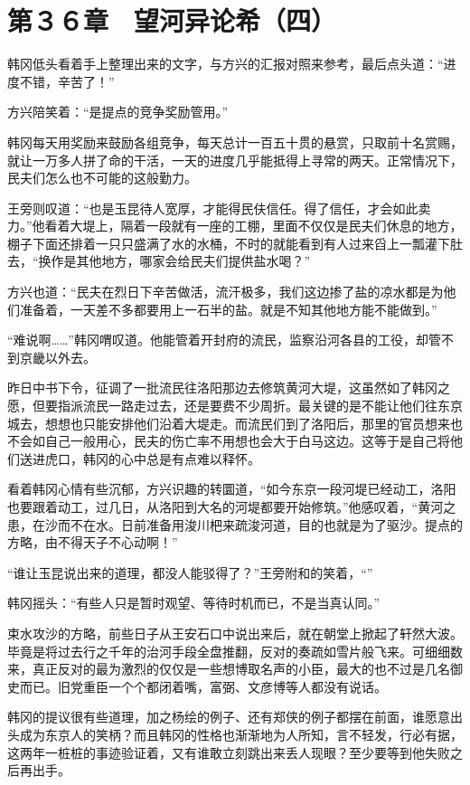\section{第３６章　望河异论希（四）}

韩冈低头看着手上整理出来的文字，与方兴的汇报对照来参考，最后点头道：“进度不错，辛苦了！”

方兴陪笑着：“是提点的竞争奖励管用。”

韩冈每天用奖励来鼓励各组竞争，每天总计一百五十贯的悬赏，只取前十名赏赐，就让一万多人拼了命的干活，一天的进度几乎能抵得上寻常的两天。正常情况下，民夫们怎么也不可能的这般勤力。

王旁则叹道：“也是玉昆待人宽厚，才能得民伕信任。得了信任，才会如此卖力。”他看着大堤上，隔着一段就有一座的工棚，里面不仅仅是民夫们休息的地方，棚子下面还排着一只只盛满了水的水桶，不时的就能看到有人过来舀上一瓢灌下肚去，“换作是其他地方，哪家会给民夫们提供盐水喝？”

方兴也道：“民夫在烈日下辛苦做活，流汗极多，我们这边掺了盐的凉水都是为他们准备着，一天差不多都要用上一石半的盐。就是不知其他地方能不能做到。”

“难说啊……”韩冈喟叹道。他能管着开封府的流民，监察沿河各县的工役，却管不到京畿以外去。

昨日中书下令，征调了一批流民往洛阳那边去修筑黄河大堤，这虽然如了韩冈之愿，但要指派流民一路走过去，还是要费不少周折。最关键的是不能让他们往东京城去，想想也只能安排他们沿着大堤走。而流民们到了洛阳后，那里的官员想来也不会如自己一般用心，民夫的伤亡率不用想也会大于白马这边。这等于是自己将他们送进虎口，韩冈的心中总是有点难以释怀。

看着韩冈心情有些沉郁，方兴识趣的转圜道，“如今东京一段河堤已经动工，洛阳也要跟着动工，过几日，从洛阳到大名的河堤都要开始修筑。”他感叹着，“黄河之患，在沙而不在水。日前准备用浚川杷来疏浚河道，目的也就是为了驱沙。提点的方略，由不得天子不心动啊！”

“谁让玉昆说出来的道理，都没人能驳得了？”王旁附和的笑着，“”

韩冈摇头：“有些人只是暂时观望、等待时机而已，不是当真认同。”

束水攻沙的方略，前些日子从王安石口中说出来后，就在朝堂上掀起了轩然大波。毕竟是将过去行之千年的治河手段全盘推翻，反对的奏疏如雪片般飞来。可细细数来，真正反对的最为激烈的仅仅是一些想博取名声的小臣，最大的也不过是几名御史而已。旧党重臣一个个都闭着嘴，富弼、文彦博等人都没有说话。

韩冈的提议很有些道理，加之杨绘的例子、还有郑侠的例子都摆在前面，谁愿意出头成为东京人的笑柄？而且韩冈的性格也渐渐地为人所知，言不轻发，行必有据，这两年一桩桩的事迹验证着，又有谁敢立刻跳出来丢人现眼？至少要等到他失败之后再出手。


